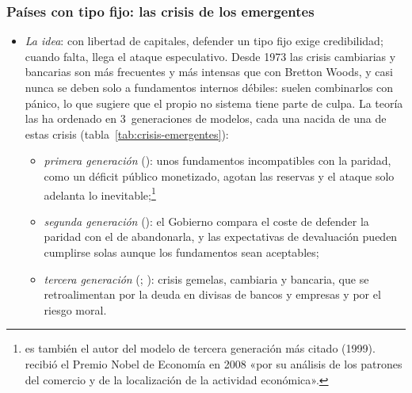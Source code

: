 \documentclass[11pt]{article}
\begin{document}
\subsubsection{Países con tipo fijo: las crisis de los emergentes}\label{sec:crisis-emergentes}

\begin{itemize}
\item \emph{La idea}: con libertad de capitales, defender un tipo fijo exige credibilidad; cuando falta, llega el ataque especulativo. Desde 1973 las crisis cambiarias y bancarias son más frecuentes y más intensas que con Bretton Woods, y casi nunca se deben solo a fundamentos internos débiles: suelen combinarlos con pánico, lo que sugiere que el propio no sistema tiene parte de culpa\nocite{LaevenValencia2020,ReinhartRogoff2009This}. La teoría las ha ordenado en 3~generaciones de modelos, cada una nacida de una de estas crisis  (tabla~\ref{tab:crisis-emergentes}):
  \begin{itemize}
  \item \emph{primera generación} (\textcite{Krugman1979Model}): unos fundamentos incompatibles con la paridad, como un déficit público monetizado, agotan las reservas y el ataque solo adelanta lo inevitable;\footnote{ es también el autor del modelo de tercera generación más citado (1999).  recibió el Premio Nobel de Economía en 2008 «por su análisis de los patrones del comercio y de la localización de la actividad económica»\nocite{Nobel2008Krugman}.}
  \item \emph{segunda generación} (\textcite{Obstfeld1994Logic,Obstfeld1996}): el Gobierno compara el coste de defender la paridad con el de abandonarla, y las expectativas de devaluación pueden cumplirse solas aunque los fundamentos sean aceptables;
  \item \emph{tercera generación} (\textcite{Krugman1999Balance}; \textcite{CorsettiPesentiRoubini1999}): crisis gemelas, cambiaria y bancaria, que se retroalimentan por la deuda en divisas de bancos y empresas y por el riesgo moral.
  \end{itemize}
\end{itemize}
\end{document}
